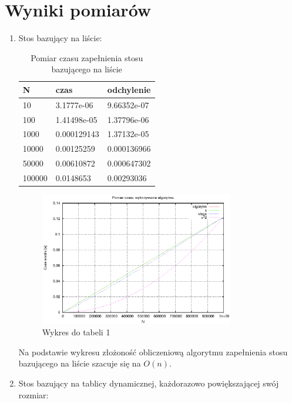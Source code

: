 \documentclass[a4paper,11pt]{article}
\begin{document}
\section{Wyniki pomiarów}
\begin{enumerate}
 \item Stos bazujący na liście:
   
  \begin{table}[th]
  \centering
    \caption{Pomiar czasu zapełnienia stosu bazującego na liście}

      \begin{tabular}{|l|l|l|}
      
	\hline
	N & czas & odchylenie \\
    \hline
  10 & 3.1777e-06 & 9.66352e-07\\
  \hline
100 & 1.41498e-05 & 1.37796e-06\\
\hline
1000 & 0.000129143 & 1.37132e-05\\
\hline
10000 & 0.00125259 & 0.000136966\\
\hline
50000 & 0.00610872 & 0.000647302\\
\hline
100000 & 0.0148653 & 0.00293036\\
\hline
    \end{tabular}
    \end{table}
    \newpage
 \begin{figure}[th]
\centering
\includegraphics[width=0.8\textwidth]{wykres1.eps}
\caption{Wykres do tabeli 1}
\label{Wykres do tabeli 1}
\end{figure} 
Na podstawie wykresu złożoność obliczeniową algorytmu zapełnienia stosu bazującego na liście szacuje się na $ O(n) $.

\item Stos bazujący na tablicy dynamicznej, każdorazowo powiększającej swój rozmiar:


\end{enumerate}
\end{document}

